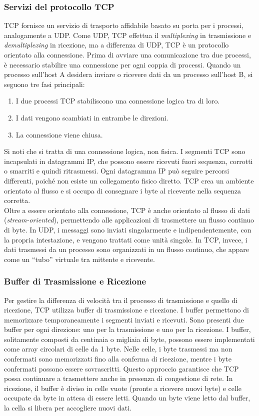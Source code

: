 \documentclass[12pt]{report}
\begin{document}
	\subsubsection{Servizi del protocollo TCP}
	TCP fornisce un servizio di trasporto affidabile basato su porta per i processi, analogamente a UDP. Come UDP, TCP effettua il \textit{multiplexing} in trasmissione e \textit{demultiplexing} in ricezione, ma a differenza di UDP, TCP è un protocollo orientato alla connessione. Prima di avviare una comunicazione tra due processi, è necessario stabilire una connessione per ogni coppia di processi.
	Quando un processo sull'host A desidera inviare o ricevere dati da un processo sull'host B, si seguono tre fasi principali:
	\begin{enumerate}
		\item I due processi TCP stabiliscono una connessione logica tra di loro.
		\item I dati vengono scambiati in entrambe le direzioni.
		\item La connessione viene chiusa.
	\end{enumerate}
	Si noti che si tratta di una connessione logica, non fisica. I segmenti TCP sono incapsulati in datagrammi IP, che possono essere ricevuti fuori sequenza, corrotti o smarriti e quindi ritrasmessi. Ogni datagramma IP può seguire percorsi differenti, poiché non esiste un collegamento fisico diretto. TCP crea un ambiente orientato al flusso e si occupa di consegnare i byte al ricevente nella sequenza corretta.
	\vspace{\baselineskip}\\
	Oltre a essere orientato alla connessione, TCP è anche orientato al flusso di dati (\textit{stream-oriented}), permettendo alle applicazioni di trasmettere un flusso continuo di byte. In UDP, i messaggi sono inviati singolarmente e indipendentemente, con la propria intestazione, e vengono trattati come unità singole. In TCP, invece, i dati trasmessi da un processo sono organizzati in un flusso continuo, che appare come un “tubo” virtuale tra mittente e ricevente.

	\subsubsection{Buffer di Trasmissione e Ricezione}
	Per gestire la differenza di velocità tra il processo di trasmissione e quello di ricezione, TCP utilizza buffer di trasmissione e ricezione. I buffer permettono di memorizzare temporaneamente i segmenti inviati e ricevuti. Sono presenti due buffer per ogni direzione: uno per la trasmissione e uno per la ricezione.
	I buffer, solitamente composti da centinaia o migliaia di byte, possono essere implementati come array circolari di celle da 1 byte. Nelle celle, i byte trasmessi ma non confermati sono memorizzati fino alla conferma di ricezione, mentre i byte confermati possono essere sovrascritti. Questo approccio garantisce che TCP possa continuare a trasmettere anche in presenza di congestione di rete.
	In ricezione, il buffer è diviso in celle vuote (pronte a ricevere nuovi byte) e celle occupate da byte in attesa di essere letti. Quando un byte viene letto dal buffer, la cella si libera per accogliere nuovi dati.
\end{document}
